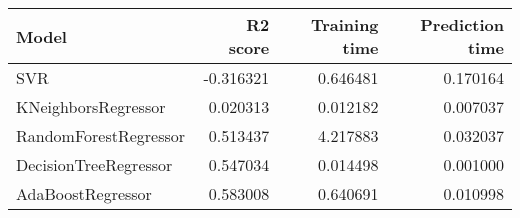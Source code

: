 \begin{tabular}{lrrr}
\toprule
Model & R2 score & Training time & Prediction time \\
\midrule
SVR & -0.316321 & 0.646481 & 0.170164 \\
KNeighborsRegressor & 0.020313 & 0.012182 & 0.007037 \\
RandomForestRegressor & 0.513437 & 4.217883 & 0.032037 \\
DecisionTreeRegressor & 0.547034 & 0.014498 & 0.001000 \\
AdaBoostRegressor & 0.583008 & 0.640691 & 0.010998 \\
\bottomrule
\end{tabular}
